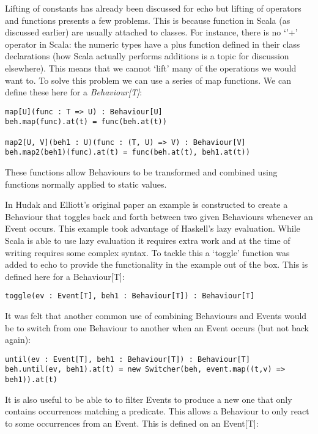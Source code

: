       Lifting of constants has already been discussed for echo but lifting of operators and
      functions presents a few problems. This is because function in Scala (as discussed earlier)
      are usually attached to classes. For instance, there is no `'+' operator in Scala: the numeric
      types have a plus function defined in their class declarations (how Scala actually performs additions
      is a topic for discussion elsewhere). This means that we cannot `lift' many of the operations we
      would want to. To solve this problem we can use a series of map functions. We can define these
      here for a \emph{Behaviour[T]}:

\begin{verbatim}
map[U](func : T => U) : Behaviour[U]
beh.map(func).at(t) = func(beh.at(t))

map2[U, V](beh1 : U)(func : (T, U) => V) : Behaviour[V]
beh.map2(beh1)(func).at(t) = func(beh.at(t), beh1.at(t))
\end{verbatim}        

      These functions allow Behaviours to be transformed and combined using functions
      normally applied to static values.
      
      In Hudak and Elliott's original paper an example is constructed to create a Behaviour
      that toggles back and forth between two given Behaviours whenever an Event occurs. This
      example took advantage of Haskell's lazy evaluation. While Scala is able to use lazy evaluation
      it requires extra work and at the time of writing requires some complex syntax. To tackle this
      a `toggle' function was added to echo to provide the functionality in the example out of the box.
      This is defined here for a Behaviour[T]:
      
\begin{verbatim}
toggle(ev : Event[T], beh1 : Behaviour[T]) : Behaviour[T]
\end{verbatim}        
      
      It was felt that another common use of combining Behaviours and Events would be
      to switch from one Behaviour to another when an Event occurs (but not back again):

\begin{verbatim}
until(ev : Event[T], beh1 : Behaviour[T]) : Behaviour[T]
beh.until(ev, beh1).at(t) = new Switcher(beh, event.map((t,v) => beh1)).at(t)
\end{verbatim}        
      
      It is also useful to be able to to filter Events to produce a new one that only
      contains occurrences matching a predicate. This allows a Behaviour to only react
      to some occurrences from an Event. This is defined on an Event[T]:

